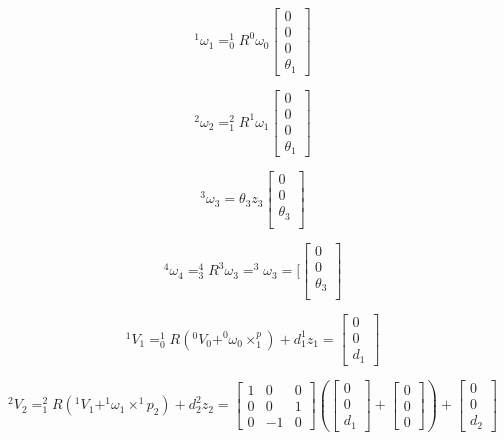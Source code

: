 \documentclass[12pt]{article}
\begin{document}
\[^1\omega_1=^1_0 R ^0\omega_0\left[
\begin{array}{c}
0 \\
0 \\
0 \\
\theta_1
\end{array} \right]\]


\[^2\omega_2=^2_1 R ^1\omega_1\left[
\begin{array}{c}
0 \\
0 \\
0 \\
\theta_1
\end{array} \right]\]


\[^3\omega_3=\theta_3 z_3\left[
\begin{array}{c}
0 \\
0 \\
\theta_3 \\
\end{array} \right]\]

\[^4\omega_4=^4_3 R ^3\omega_3 = ^3\omega_3=[
\left[
\begin{array}{c}
0 \\
0 \\
\theta_3 \\
\end{array} \right]\]

\[
^1 V_1=^1_0 R\left(^0 V_0 + ^0 \omega_0 \times ^p_1\right)+d_1 ^{1}z_1 =  
\left[
\begin{array}{c}
0\\
0\\
d_1
\end{array} \right] 
\]

\[
^2 V_2 = ^2_1R\left(^1V_1+^1\omega_1\times ^1 p_2\right)+d_2 ^2 z_2=\left[
\begin{array}{ccc}
1 & 0 & 0 \\
0 & 0 & 1\\
0 & -1 & 0 
\end{array} \right]
\left(
\left[
\begin{array}{c}
0\\
0\\
d_1
\end{array} \right] +
\left[
\begin{array}{c}
0\\
0\\
0
\end{array} \right] \right) + 
\left[
\begin{array}{c}
0\\
0\\
d_2
\end{array} \right] 
\]
\end{document}
